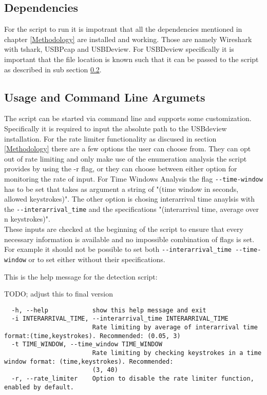 \subsection{Dependencies}

For the script to run it is impotrant that all the dependencies mentioned in chapter \ref{Methodology} are installed and working. Those are namely Wireshark with tshark, USBPcap and USBDeview. For USBDeview specifically it is important that the file location is known such that it can be passed to the script as described in sub section \ref{Usage and Command Line Argumets}.



\subsection{Usage and Command Line Argumets} \label{Usage and Command Line Argumets}

The script can be started via command line and supports some customization. Specifically it is required to input the absolute path to the USBdeview installation. For the rate limiter functionality as discused in section \ref{Methodology} there are a few options the user can choose from. They can opt out of rate limiting and only make use of the enumeration analysis the script provides by using the -r flag, or they can choose between either option for monitoring the rate of input. For Time Windows Analysis the flag \verb|--time-window| has to be set that takes as argument a string of "(time window in seconds, allowed keystrokes)". The other option is chosing interarrival time anaylsis with the \verb|--interarrival_time| and the specifications "(interarrival time, average over n keystrokes)". \\
These inputs are checked at the beginning of the script to ensure that every necessary information is available and no impossible combination of flags is set. For example it should not be possible to set both 
\verb|--interarrival_time --time-window| or to set either without their specifications. 

This is the help message for the detection script:

 TODO; adjust this to final version
\begin{lstlisting}
  -h, --help            show this help message and exit
  -i INTERARRIVAL_TIME, --interarrival_time INTERARRIVAL_TIME
                        Rate limiting by average of interarrival time format:(time,keystrokes). Recommended: (0.05, 3)
  -t TIME_WINDOW, --time_window TIME_WINDOW
                        Rate limiting by checking keystrokes in a time window format: (time,keystrokes). Recommended:
                        (3, 40)
  -r, --rate_limiter    Option to disable the rate limiter function, enabled by default.
\end{lstlisting}



